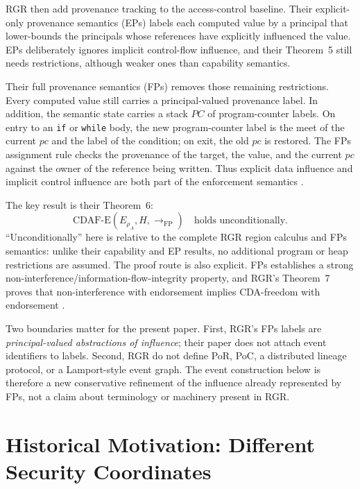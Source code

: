 \documentclass[10pt,twocolumn]{article}
\newcommand{\FP}{\mathrm{FP}}
\newcommand{\CDAF}{\mathrm{CDAF\text{-}E}}
\begin{document}
RGR then add provenance tracking to the access-control baseline. Their
explicit-only provenance semantics (EPs) labels each computed value by a
principal that lower-bounds the principals whose references have explicitly
influenced the value. EPs deliberately ignores implicit control-flow
influence, and their Theorem~5 still needs restrictions, although weaker ones
than capability semantics.

Their full provenance semantics (FPs) removes those remaining restrictions.
Every computed value still carries a principal-valued provenance label. In
addition, the semantic state carries a stack $PC$ of program-counter labels.
On entry to an \texttt{if} or \texttt{while} body, the new program-counter
label is the meet of the current $pc$ and the label of the condition; on exit,
the old $pc$ is restored. The FPs assignment rule checks the provenance of the
target, the value, and the current $pc$ against the owner of the reference being
written. Thus explicit data influence and implicit control influence are both
part of the enforcement semantics \cite{rajani_garg_rezk2016}.

The key result is their Theorem~6:
\begin{equation}
  \CDAF(E_{\rho_A},H,\to_{\FP})
  \quad\text{holds unconditionally.}
  \label{eq:rgr-thm6}
\end{equation}
``Unconditionally'' here is relative to the complete RGR region calculus and
FPs semantics: unlike their capability and EP results, no additional program or
heap restrictions are assumed. The proof route is also explicit. FPs
establishes a strong non-interference/information-flow-integrity property, and
RGR's Theorem~7 proves that non-interference with endorsement implies
CDA-freedom with endorsement \cite{rajani_garg_rezk2016}.

Two boundaries matter for the present paper. First, RGR's FPs labels are
\emph{principal-valued abstractions of influence}; their paper does not attach
event identifiers to labels. Second, RGR do not define PoR, PoC, a distributed
lineage protocol, or a Lamport-style event graph. The event construction below
is therefore a new conservative refinement of the influence already represented
by FPs, not a claim about terminology or machinery present in RGR.

\section{Historical Motivation: Different Security Coordinates}
\end{document}

